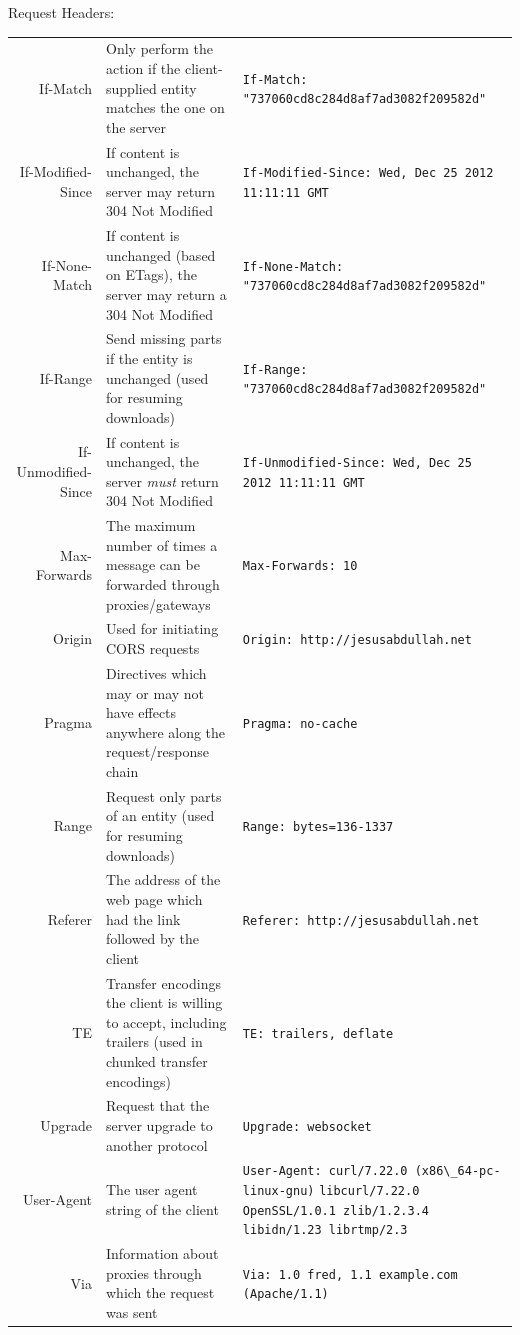 \documentclass[final]{beamer}
\newcommand{\header}[1]{\texttt{\lstinline!#1!}}
\begin{document}
\begin{frame}{}
\begin{columns}
\begin{column}{0.4\textwidth}
\begin{block}{\huge{Request Headers:}}
\begin{tabular}{r p{} p{}}
            If-Match & Only perform the action if the client-supplied entity matches the one on the server & \header{If-Match: "737060cd8c284d8af7ad3082f209582d" } \\
            If-Modified-Since & If content is unchanged, the server may return 304 Not Modified & \header{If-Modified-Since: Wed, Dec 25 2012 11:11:11 GMT } \\
            If-None-Match & If content is unchanged (based on ETags), the server may return a 304 Not Modified & \header{If-None-Match: "737060cd8c284d8af7ad3082f209582d" } \\
            If-Range & Send missing parts if the entity is unchanged (used for resuming downloads) & \header{If-Range: "737060cd8c284d8af7ad3082f209582d" } \\
            If-Unmodified-Since & If content is unchanged, the server \emph{must} return 304 Not Modified & \header{If-Unmodified-Since: Wed, Dec 25 2012 11:11:11 GMT } \\
            Max-Forwards & The maximum number of times a message can be forwarded through proxies/gateways & \header{Max-Forwards: 10 } \\
            Origin & Used for initiating CORS requests & \header{Origin: http://jesusabdullah.net } \\
            Pragma & Directives which may or may not have effects anywhere along the request/response chain & \header{Pragma: no-cache } \\
            Range & Request only parts of an entity (used for resuming downloads) & \header{Range: bytes=136-1337} \\
            Referer & The address of the web page which had the link followed by the client & \header{Referer: http://jesusabdullah.net } \\
            TE & Transfer encodings the client is willing to accept, including trailers (used in chunked transfer encodings) & \header{TE: trailers, deflate } \\
            Upgrade & Request that the server upgrade to another protocol & \header{Upgrade: websocket } \\
            User-Agent & The user agent string of the client & \header{User-Agent: curl/7.22.0 (x86\_64-pc-linux-gnu)} \header{libcurl/7.22.0 OpenSSL/1.0.1 zlib/1.2.3.4} \header{libidn/1.23 librtmp/2.3} \\
            Via & Information about proxies through which the request was sent & \header{Via: 1.0 fred, 1.1 example.com (Apache/1.1) } \\

\end{tabular}
\end{block}
\end{column}
\end{columns}
\end{frame}
\end{document}
